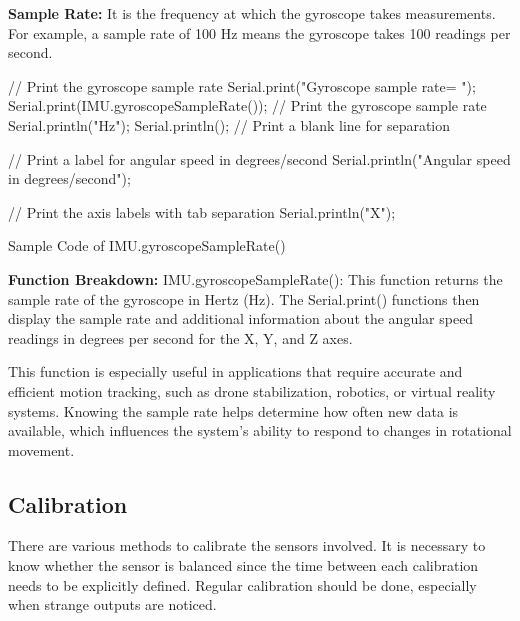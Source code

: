 \textbf{Sample Rate:} It is the frequency at which the gyroscope takes measurements. For example, a sample rate of 100 Hz means the gyroscope takes 100 readings per second.
\newline
\begin{code}[h!]
	\begin{Arduino}
	// Print the gyroscope sample rate
	Serial.print("Gyroscope sample rate= ");
	Serial.print(IMU.gyroscopeSampleRate());  // Print the gyroscope sample rate
	Serial.println("Hz");
	Serial.println();  // Print a blank line for separation
	
	// Print a label for angular speed in degrees/second
	Serial.println("Angular speed in degrees/second");
	
	// Print the axis labels with tab separation
	Serial.println("X\tY\tZ");
	
	\end{Arduino}
\caption{Sample Code of IMU.gyroscopeSampleRate()}\label{code:IMU.gyroscopeSampleRate()}
\end{code}	
\textbf{Function Breakdown:}
IMU.gyroscopeSampleRate(): This function returns the sample rate of the gyroscope in Hertz (Hz).
The Serial.print() functions then display the sample rate and additional information about the angular speed readings in degrees per second for the X, Y, and Z axes.

This function is especially useful in applications that require accurate and efficient motion tracking, such as drone stabilization, robotics, or virtual reality systems. Knowing the sample rate helps determine how often new data is available, which influences the system's ability to respond to changes in rotational movement.


\subsection{Calibration}
There are various methods to calibrate the sensors involved. It is necessary to know whether the sensor is balanced since the time between each calibration needs to be explicitly defined. Regular calibration should be done, especially when strange outputs are noticed. 


